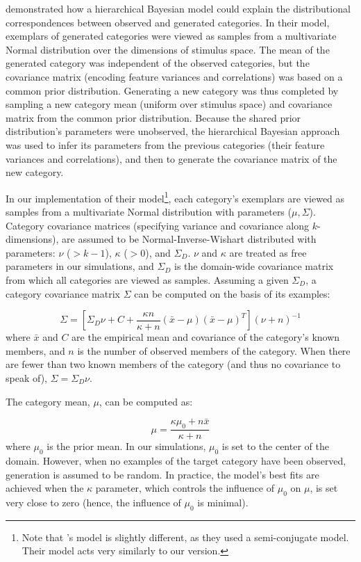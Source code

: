 \documentclass[12pt]{article}
\begin{document}
\cite{jern2013probabilistic} demonstrated how a hierarchical Bayesian model
could explain the distributional correspondences between observed and generated
categories. In their model, exemplars of generated categories were viewed as
samples from a multivariate Normal distribution over the dimensions of stimulus
space. The mean of the generated category was independent of the observed
categories, but the covariance matrix (encoding feature variances and
correlations) was based on a common prior distribution. Generating a new
category was thus completed by sampling a new category mean (uniform over
stimulus space) and covariance matrix from the common prior distribution.
Because the shared prior distribution's parameters were unobserved, the
hierarchical Bayesian approach was used to infer its parameters from the
previous categories (their feature variances and correlations), and then to
generate the covariance matrix of the new category.

In our implementation of their model\footnote{Note that
\citet{jern2013probabilistic}'s model is slightly different, as they used a
semi-conjugate model. Their model acts very similarly to our version.}, each
category's exemplars are viewed as samples from a multivariate Normal
distribution with parameters ($\mu, \Sigma$). Category covariance matrices
(specifying variance and covariance along $k$-dimensions), are assumed to be
Normal-Inverse-Wishart distributed with parameters: $\nu$ ($>k-1$), $\kappa$
($>0$), and $\Sigma_D$. $\nu$ and $\kappa$ are treated as free parameters in our
simulations, and $\Sigma_D$ is the domain-wide covariance matrix from which all
categories are viewed as samples. Assuming a given $\Sigma_D$, a category
covariance matrix $\Sigma$ can be computed on the basis of its examples:

\begin{equation} \Sigma = \left[ \Sigma_D \nu + C + \dfrac {\kappa n} {\kappa +
n} (\bar{x}-\mu)(\bar{x}-\mu)^T \right] (\nu + n)^{-1}
\label{eq:Sigma_B}
\end{equation}
% 
where $\bar{x}$ and $C$ are the empirical mean and covariance of the category's
known members, and $n$ is the number of observed members of the category. When
there are fewer than two known members of the category (and thus no covariance
to speak of), $\Sigma = \Sigma_D\nu$.

The category mean, $\mu$, can be computed as:

\begin{equation} \mu = \dfrac {\kappa\mu_{0} + n \bar{x}} {\kappa + n}
    \label{eq:category_mus_jk13}
\end{equation}
% 
where $\mu_{0}$ is the prior mean. In our simulations, $\mu_{0}$ is set to the
center of the domain. However, when no examples of the target category have been
observed, generation is assumed to be random. In practice, the model's best fits
are achieved when the $\kappa$ parameter, which controls the influence of
$\mu_0$ on $\mu$, is set very close to zero (hence, the influence of $\mu_0$ is
minimal).
\end{document}
